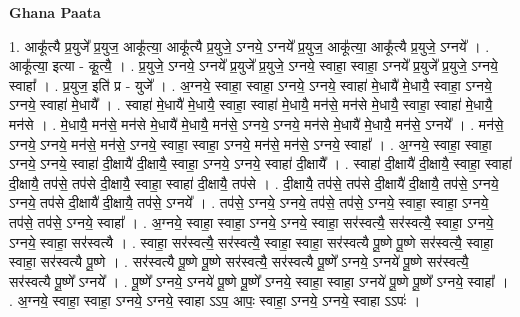 \documentclass[17pt]{extarticle}
\begin{document}
\textbf{Ghana Paata } \newline

1. आकू᳚त्यै प्र॒युजे᳚ प्र॒युज॒ आकू᳚त्या॒ आकू᳚त्यै प्र॒युजे॒ ऽग्नये॒ ऽग्नये᳚ प्र॒युज॒ आकू᳚त्या॒ आकू᳚त्यै प्र॒युजे॒ ऽग्नये᳚ । . आकू᳚त्या॒ इत्या - कू॒त्यै॒ । . प्र॒युजे॒ ऽग्नये॒ ऽग्नये᳚ प्र॒युजे᳚ प्र॒युजे॒ ऽग्नये॒ स्वाहा॒ स्वाहा॒ ऽग्नये᳚ प्र॒युजे᳚ प्र॒युजे॒ ऽग्नये॒ स्वाहा᳚ । . प्र॒युज॒ इति॑ प्र - युजे᳚ । . अ॒ग्नये॒ स्वाहा॒ स्वाहा॒ ऽग्नये॒ ऽग्नये॒ स्वाहा॑ मे॒धायै॑ मे॒धायै॒ स्वाहा॒ ऽग्नये॒ ऽग्नये॒ स्वाहा॑ मे॒धायै᳚ । . स्वाहा॑ मे॒धायै॑ मे॒धायै॒ स्वाहा॒ स्वाहा॑ मे॒धायै॒ मन॑से॒ मन॑से मे॒धायै॒ स्वाहा॒ स्वाहा॑ मे॒धायै॒ मन॑से । . मे॒धायै॒ मन॑से॒ मन॑से मे॒धायै॑ मे॒धायै॒ मन॑से॒ ऽग्नये॒ ऽग्नये॒ मन॑से मे॒धायै॑ मे॒धायै॒ मन॑से॒ ऽग्नये᳚ । . मन॑से॒ ऽग्नये॒ ऽग्नये॒ मन॑से॒ मन॑से॒ ऽग्नये॒ स्वाहा॒ स्वाहा॒ ऽग्नये॒ मन॑से॒ मन॑से॒ ऽग्नये॒ स्वाहा᳚ । . अ॒ग्नये॒ स्वाहा॒ स्वाहा॒ ऽग्नये॒ ऽग्नये॒ स्वाहा॑ दी॒क्षायै॑ दी॒क्षायै॒ स्वाहा॒ ऽग्नये॒ ऽग्नये॒ स्वाहा॑ दी॒क्षायै᳚ । . स्वाहा॑ दी॒क्षायै॑ दी॒क्षायै॒ स्वाहा॒ स्वाहा॑ दी॒क्षायै॒ तप॑से॒ तप॑से दी॒क्षायै॒ स्वाहा॒ स्वाहा॑ दी॒क्षायै॒ तप॑से । . दी॒क्षायै॒ तप॑से॒ तप॑से दी॒क्षायै॑ दी॒क्षायै॒ तप॑से॒ ऽग्नये॒ ऽग्नये॒ तप॑से दी॒क्षायै॑ दी॒क्षायै॒ तप॑से॒ ऽग्नये᳚ । . तप॑से॒ ऽग्नये॒ ऽग्नये॒ तप॑से॒ तप॑से॒ ऽग्नये॒ स्वाहा॒ स्वाहा॒ ऽग्नये॒ तप॑से॒ तप॑से॒ ऽग्नये॒ स्वाहा᳚ । . अ॒ग्नये॒ स्वाहा॒ स्वाहा॒ ऽग्नये॒ ऽग्नये॒ स्वाहा॒ सर॑स्वत्यै॒ सर॑स्वत्यै॒ स्वाहा॒ ऽग्नये॒ ऽग्नये॒ स्वाहा॒ सर॑स्वत्यै । . स्वाहा॒ सर॑स्वत्यै॒ सर॑स्वत्यै॒ स्वाहा॒ स्वाहा॒ सर॑स्वत्यै पू॒ष्णे पू॒ष्णे सर॑स्वत्यै॒ स्वाहा॒ स्वाहा॒ सर॑स्वत्यै पू॒ष्णे । . सर॑स्वत्यै पू॒ष्णे पू॒ष्णे सर॑स्वत्यै॒ सर॑स्वत्यै पू॒ष्णे᳚ ऽग्नये॒ ऽग्नये॑ पू॒ष्णे सर॑स्वत्यै॒ सर॑स्वत्यै पू॒ष्णे᳚ ऽग्नये᳚ । . पू॒ष्णे᳚ ऽग्नये॒ ऽग्नये॑ पू॒ष्णे पू॒ष्णे᳚ ऽग्नये॒ स्वाहा॒ स्वाहा॒ ऽग्नये॑ पू॒ष्णे पू॒ष्णे᳚ ऽग्नये॒ स्वाहा᳚ । . अ॒ग्नये॒ स्वाहा॒ स्वाहा॒ ऽग्नये॒ ऽग्नये॒ स्वाहा ऽऽप॒ आपः॒ स्वाहा॒ ऽग्नये॒ ऽग्नये॒ स्वाहा ऽऽपः॑ । \newline
\end{document}
